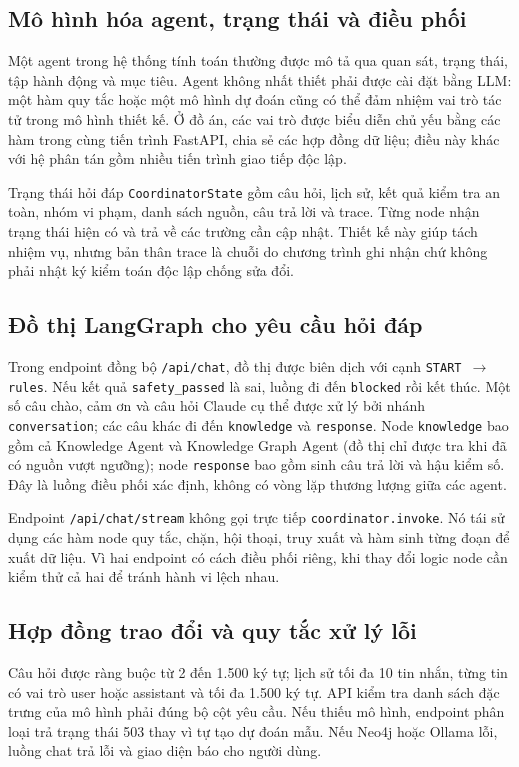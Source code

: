 \subsection{Mô hình hóa agent, trạng thái và điều phối}
Một agent trong hệ thống tính toán thường được mô tả qua quan sát, trạng thái, tập hành động và mục tiêu. Agent không nhất thiết phải được cài đặt bằng LLM: một hàm quy tắc hoặc một mô hình dự đoán cũng có thể đảm nhiệm vai trò tác tử trong mô hình thiết kế. Ở đồ án, các vai trò được biểu diễn chủ yếu bằng các hàm trong cùng tiến trình FastAPI, chia sẻ các hợp đồng dữ liệu; điều này khác với hệ phân tán gồm nhiều tiến trình giao tiếp độc lập.

Trạng thái hỏi đáp \texttt{CoordinatorState} gồm câu hỏi, lịch sử, kết quả kiểm tra an toàn, nhóm vi phạm, danh sách nguồn, câu trả lời và trace. Từng node nhận trạng thái hiện có và trả về các trường cần cập nhật. Thiết kế này giúp tách nhiệm vụ, nhưng bản thân trace là chuỗi do chương trình ghi nhận chứ không phải nhật ký kiểm toán độc lập chống sửa đổi.
\subsection{Đồ thị LangGraph cho yêu cầu hỏi đáp}
Trong endpoint đồng bộ \texttt{/api/chat}, đồ thị được biên dịch với cạnh \texttt{START $\rightarrow$ rules}. Nếu kết quả \texttt{safety\_passed} là sai, luồng đi đến \texttt{blocked} rồi kết thúc. Một số câu chào, cảm ơn và câu hỏi Claude cụ thể được xử lý bởi nhánh \texttt{conversation}; các câu khác đi đến \texttt{knowledge} và \texttt{response}. Node \texttt{knowledge} bao gồm cả Knowledge Agent và Knowledge Graph Agent (đồ thị chỉ được tra khi đã có nguồn vượt ngưỡng); node \texttt{response} bao gồm sinh câu trả lời và hậu kiểm số. Đây là luồng điều phối xác định, không có vòng lặp thương lượng giữa các agent.

Endpoint \texttt{/api/chat/stream} không gọi trực tiếp \texttt{coordinator.invoke}. Nó tái sử dụng các hàm node quy tắc, chặn, hội thoại, truy xuất và hàm sinh từng đoạn để xuất dữ liệu. Vì hai endpoint có cách điều phối riêng, khi thay đổi logic node cần kiểm thử cả hai để tránh hành vi lệch nhau.
\subsection{Hợp đồng trao đổi và quy tắc xử lý lỗi}
Câu hỏi được ràng buộc từ 2 đến 1.500 ký tự; lịch sử tối đa 10 tin nhắn, từng tin có vai trò user hoặc assistant và tối đa 1.500 ký tự. API kiểm tra danh sách đặc trưng của mô hình phải đúng bộ cột yêu cầu. Nếu thiếu mô hình, endpoint phân loại trả trạng thái 503 thay vì tự tạo dự đoán mẫu. Nếu Neo4j hoặc Ollama lỗi, luồng chat trả lỗi và giao diện báo cho người dùng.

